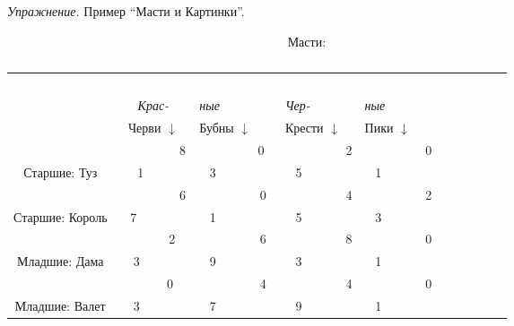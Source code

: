 \documentclass[a4paper,12pt]{article}
\begin{document}
{\em Упражнение.} Пример ``Масти и Картинки''.
 \begin{table}[hbt]  \caption{}
~~~~~~~~~~~~~~~~~~~~~~~~~~~~~~~~~~~~~~~~~~~~ Масти:  \\
{\begin{tabular}{cc|l|l|l|l}
               &      &             &~~~          &    &     \\
               &     {\em Крас- }      &  {\em ные }      &  {\em Чер-}     &  {\em ные }  &      \\
\cline{2-5}%
               & Черви $\downarrow$ &   Бубны $\downarrow$ & Крести $\downarrow$ &     Пики $
\downarrow$ &            \\
\cline{2-5}%
             ~~~   &~~~ ~~~~~ 8 &~~~ ~~~~~ 0 &~~~~~~~~~  2 &~~~~~~~~~  0 &~~~~~~~~~   \\
   Старшие: Туз &~  1~~~ ~~&~ 3~~~ ~~ &~ 5         ~&~ 1        ~&~         \\
\cline{2-5}%
                 &~~~ ~~~~~ 6&~~~~~~~~~ 0  &~~~~~~~~~  4 &~~~~~~~~~  2 &~~~~~~~~~   \\
   Старшие: Король &~ 7~~~~~~~~&~ 1~~~~~~~~  &~ 5~~~~ ~~ &~ 3~ ~~~~~~ &~  ~ \\
\cline{2-5}%
                 &~ ~~ ~~ 2~&~~~~~~~~~ 6  &~~~~~~~~~  8 &~~~~~~~~~  0 &~~~~~~~~~   \\
   Младшие:  Дама &~ 3~~~~~~~&~ 9~~~~~~~~~ &~  3~~~~~ ~~ &~ 1~~~~~~~ &~  ~~~~~ \\
\cline{2-5}%
\cline{2-5}%
                  &~ ~~~ ~0~&~~~~~~~~~ 4  &~~~~~~~~~ 4 &~~~~~~~~~ 0  &~~~~~~~~~   \\
 Младшие:  Валет  &~ 3~~~~~~~&~ 7~~~~~~~~~ &~ 9~~~~~ ~~ &~ 1~~~~~~~ &~  ~~~~~~~ \\
\cline{2-5}%
\end{tabular}}\label{cards}
\end{table}
\end{document}
